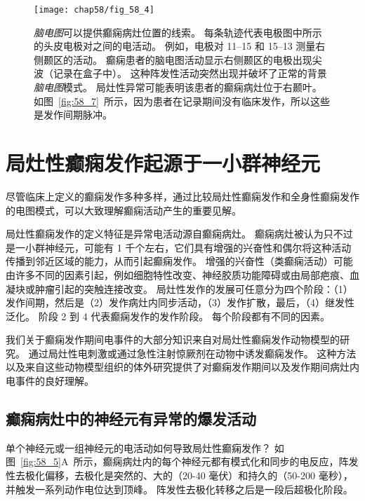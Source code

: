 \begin{figure}[htbp]
	\centering
	\texttt{[image: chap58/fig\_58\_4]}
	\caption{\textit{脑电图}可以提供癫痫病灶位置的线索。
		每条轨迹代表电极图中所示的头皮电极对之间的电活动。
		例如，电极对 11–15 和 15–13 测量右侧颞区的活动。
		癫痫患者的脑电图活动显示右侧颞区的电极出现尖波（记录在盒子中）。
		这种阵发性活动突然出现并破坏了正常的背景\textit{脑电图}模式。
		局灶性异常可能表明该患者的癫痫病灶位于右颞叶。
		如图~\ref{fig:58_7}~所示，因为患者在记录期间没有临床发作，所以这些是发作间期脉冲\cite{lothman1990seizures}。}
	\label{fig:58_4}
\end{figure}



\section{局灶性癫痫发作起源于一小群神经元}

尽管临床上定义的癫痫发作多种多样，通过比较局灶性癫痫发作和全身性癫痫发作的电图模式，可以大致理解癫痫活动产生的重要见解。


局灶性癫痫发作的定义特征是异常电活动源自癫痫病灶。
癫痫病灶被认为只不过是一小群神经元，可能有 1 千个左右，它们具有增强的兴奋性和偶尔将这种活动传播到邻近区域的能力，从而引起癫痫发作。
增强的兴奋性（类癫痫活动）可能由许多不同的因素引起，例如细胞特性改变、神经胶质功能障碍或由局部疤痕、血凝块或肿瘤引起的突触连接改变。
局灶性发作的发展可任意分为四个阶段：（1）发作间期，然后是（2）发作病灶内同步活动，（3）发作扩散，最后，（4）继发性泛化。
阶段 2 到 4 代表癫痫发作的发作阶段。
每个阶段都有不同的因素。


我们关于癫痫发作期间电事件的大部分知识来自对局灶性癫痫发作动物模型的研究。
通过局灶性电刺激或通过急性注射惊厥剂在动物中诱发癫痫发作。
这种方法以及来自这些动物模型组织的体外研究提供了对癫痫发作期间以及发作期间病灶内电事件的良好理解。



\subsection{癫痫病灶中的神经元有异常的爆发活动}

单个神经元或一组神经元的电活动如何导致局灶性癫痫发作？
如图~\ref{fig:58_5}A~所示，癫痫病灶内的每个神经元都有模式化和同步的电反应，阵发性去极化偏移，去极化是突然的、大的（20-40 毫伏）和持久的（50-200 毫秒），并触发一系列动作电位达到顶峰。
阵发性去极化转移之后是一段后超极化阶段。



